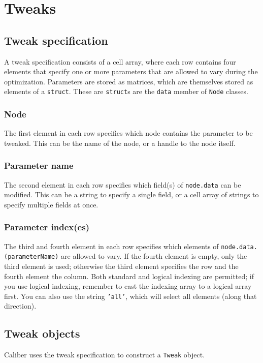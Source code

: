 \section{Tweaks}
\label{sec:tweaks}

\subsection{Tweak specification}

A tweak specification consists of a cell array, where each row contains four elements
that specify one or more parameters that are allowed to vary during the optimization.
Parameters are stored as matrices, which are themselves stored as elements of a \texttt{struct}.
These are \texttt{struct}s are the \texttt{data} member of \texttt{Node} classes.

\subsubsection{Node}
The first element in each row specifies which node contains the parameter to be tweaked.
This can be the name of the node, or a handle to the node itself.

\subsubsection{Parameter name}
The second element in each row specifies which field(s) of \texttt{node.data} can be modified.
This can be a string to specify a single field, or a cell array of strings to specify multiple 
fields at once.

\subsubsection{Parameter index(es)}
The third and fourth element in each row specifies which elements of \texttt{node.data.(parameterName)}
are allowed to vary. If the fourth element is empty, only the third element is used; otherwise the 
third element specifies the row and the fourth element the column. Both standard and logical indexing
are permitted; if you use logical indexing, remember to cast the indexing array to a logical array first.
You can also use the string \texttt{'all'}, which will select all elements (along that direction).

\subsection{Tweak objects}
Caliber uses the tweak specification to construct a \texttt{Tweak} object.

